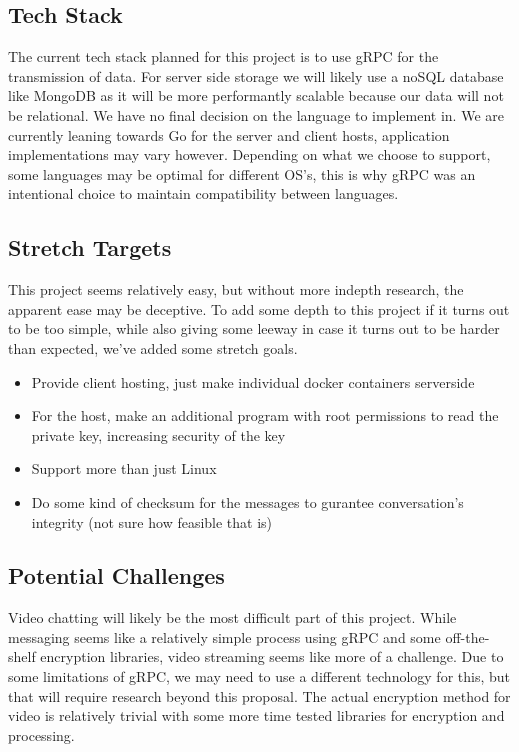 \documentclass[titlepage]{article}
\begin{document}
    \subsection{Tech Stack}

    The current tech stack planned for this project is to use gRPC for the transmission of data.
    For server side storage we will likely use a noSQL database like MongoDB as it will be more performantly scalable because our data will not be relational.
    We have no final decision on the language to implement in.
    We are currently leaning towards Go for the server and client hosts, application implementations may vary however.
    Depending on what we choose to support, some languages may be optimal for different OS's, this is why gRPC was an intentional choice to maintain compatibility between languages.

    \subsection{Stretch Targets}

    This project seems relatively easy, but without more indepth research, the apparent ease may be deceptive.
    To add some depth to this project if it turns out to be too simple, while also giving some leeway in case it turns out to be harder than expected, we've added some stretch goals.
    \begin{itemize}
        \item Provide client hosting, just make individual docker containers serverside
        \item For the host, make an additional program with root permissions to read the private key, increasing security of the key
        \item Support more than just Linux
        \item Do some kind of checksum for the messages to gurantee conversation's integrity (not sure how feasible that is)
    \end{itemize}

    \subsection{Potential Challenges}

    Video chatting will likely be the most difficult part of this project.
    While messaging seems like a relatively simple process using gRPC and some off-the-shelf encryption libraries, video streaming seems like more of a challenge.
    Due to some limitations of gRPC, we may need to use a different technology for this, but that will require research beyond this proposal.
    The actual encryption method for video is relatively trivial with some more time tested libraries for encryption and processing.
\end{document}
